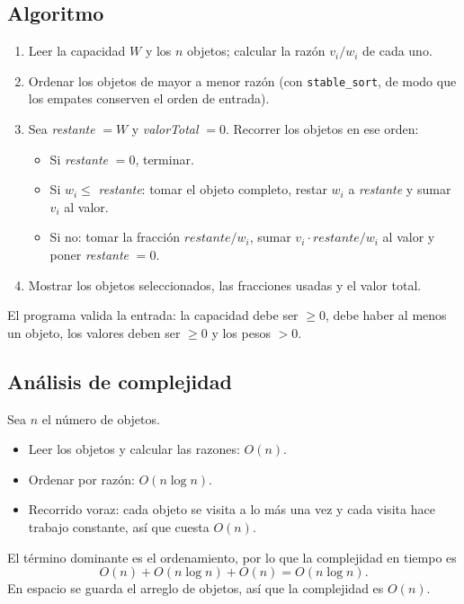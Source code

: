 \documentclass[11pt,a4paper]{article}
\begin{document}
\subsection{Algoritmo}

\begin{enumerate}
  \item Leer la capacidad $W$ y los $n$ objetos; calcular la razón $v_i / w_i$ de cada uno.
  \item Ordenar los objetos de mayor a menor razón (con \texttt{stable\_sort}, de modo que los empates conserven el orden de entrada).
  \item Sea \textit{restante} $= W$ y \textit{valorTotal} $= 0$. Recorrer los objetos en ese orden:
  \begin{itemize}
    \item Si \textit{restante} $= 0$, terminar.
    \item Si $w_i \le$ \textit{restante}: tomar el objeto completo, restar $w_i$ a \textit{restante} y sumar $v_i$ al valor.
    \item Si no: tomar la fracción $\textit{restante}/w_i$, sumar $v_i \cdot \textit{restante}/w_i$ al valor y poner \textit{restante} $= 0$.
  \end{itemize}
  \item Mostrar los objetos seleccionados, las fracciones usadas y el valor total.
\end{enumerate}

El programa valida la entrada: la capacidad debe ser $\ge 0$, debe haber al menos un objeto, los valores deben ser $\ge 0$ y los pesos $> 0$.

\subsection{Análisis de complejidad}

Sea $n$ el número de objetos.

\begin{itemize}
  \item Leer los objetos y calcular las razones: $O(n)$.
  \item Ordenar por razón: $O(n \log n)$.
  \item Recorrido voraz: cada objeto se visita a lo más una vez y cada visita hace trabajo constante, así que cuesta $O(n)$.
\end{itemize}

El término dominante es el ordenamiento, por lo que la complejidad en tiempo es
\[
  O(n) + O(n \log n) + O(n) = O(n \log n).
\]
En espacio se guarda el arreglo de objetos, así que la complejidad es $O(n)$.
\end{document}
